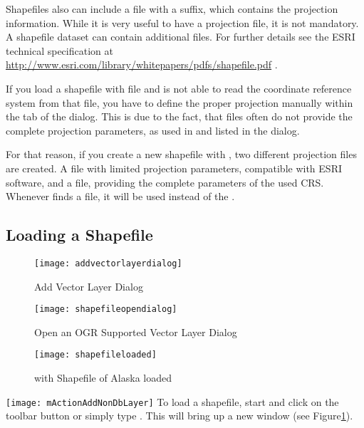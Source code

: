 Shapefiles also can include a file with a  suffix, which contains
the projection information. While it is very useful to have a projection file, it is not mandatory. A shapefile dataset can contain additional files. For further details see the ESRI technical specification at \url{http://www.esri.com/library/whitepapers/pdfs/shapefile.pdf} .


If you load a shapefile with  file and \qg is not 
able to read the coordinate reference system from that file, you have to define the 
proper projection manually within the  tab of the  dialog. This is due to the fact, that  files often  
do not provide the complete projection parameters, as used in \qg and listed in 
the  dialog. 

For that reason, if you create a new shapefile with \qg, two different projection 
files are created. A  file with limited projection parameters, 
compatible with ESRI software, and a  file, providing the complete 
parameters of the used CRS. Whenever \qg finds a  file, it will be 
used instead of the .

\subsection{Loading a Shapefile}\label{sec:load_shapefile}

\begin{figure}[ht]
   \centering
   \texttt{[image: addvectorlayerdialog]}
   \caption{Add Vector Layer Dialog \nixcaption}\label{fig:addvectorlayer}   
\end{figure}

\begin{figure}[ht]
   \centering
   \texttt{[image: shapefileopendialog]}
   \caption{Open an OGR Supported Vector Layer Dialog \nixcaption}\label{fig:openshapefile}
\end{figure}

\begin{figure}[ht]
   \centering
   \texttt{[image: shapefileloaded]}
   \caption{\qg with Shapefile of Alaska loaded \nixcaption}\label{fig:loadedshapefile}
\end{figure}

\texttt{[image: mActionAddNonDbLayer]} To load a shapefile, start
\qg and click on the 
toolbar button or simply type . 
This will bring up a new window (see Figure\ref{fig:addvectorlayer}).  

